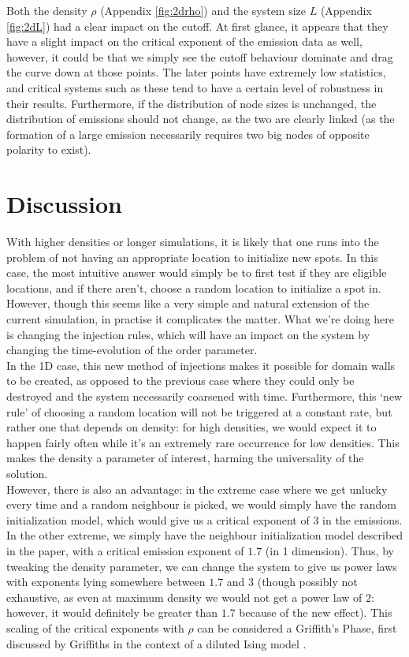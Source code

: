 \documentclass[aps, pre, reprint]{revtex4-2}
\begin{document}
Both the density $\rho$ (Appendix \autoref{fig:2drho}) and the system size $L$ (Appendix \autoref{fig:2dL}) had a clear impact on the cutoff. At first glance, it appears that they have a slight impact on the critical exponent of the emission data as well, however, it could be that we simply see the cutoff behaviour dominate and drag the curve down at those points. The later points have extremely low statistics, and critical systems such as these tend to have a certain level of robustness in their results. Furthermore, if the distribution of node sizes is unchanged, the distribution of emissions should not change, as the two are clearly linked (as the formation of a large emission necessarily requires two big nodes of opposite polarity to exist). \\


\section{Discussion}\label{sec-discussion}

With higher densities or longer simulations, it is likely that one runs into the problem of not having an appropriate location to initialize new spots. In this case, the most intuitive answer would simply be to first test if they are eligible locations, and if there aren't, choose a random location to initialize a spot in. However, though this seems like a very simple and natural extension of the current simulation, in practise it complicates the matter. What we're doing here is changing the injection rules, which will have an impact on the system by changing the time-evolution of the order parameter. \\

In the 1D case, this new method of injections makes it possible for domain walls to be created, as opposed to the previous case where they could only be destroyed and the system necessarily coarsened with time. Furthermore, this `new rule' of choosing a random location will not be triggered at a constant rate, but rather one that depends on density: for high densities, we would expect it to happen fairly often while it's an extremely rare occurrence for low densities. This makes the density a parameter of interest, harming the universality of the solution. \\

However, there is also an advantage: in the extreme case where we get unlucky every time and a random neighbour is picked, we would simply have the random initialization model, which would give us a critical exponent of $3$ in the emissions. In the other extreme, we simply have the neighbour initialization model described in the paper, with a critical emission exponent of $1.7$ (in 1 dimension). Thus, by tweaking the density parameter, we can change the system to give us power laws with exponents lying somewhere between $1.7$ and $3$ (though possibly not exhaustive, as even at maximum density we would not get a power law of $2$: however, it would definitely be greater than $1.7$ because of the new effect). This scaling of the critical exponents with $\rho$ can be considered a Griffith's Phase, first discussed by Griffiths in the context of a diluted Ising model \cite{griffithsPhase}. 
\end{document}
